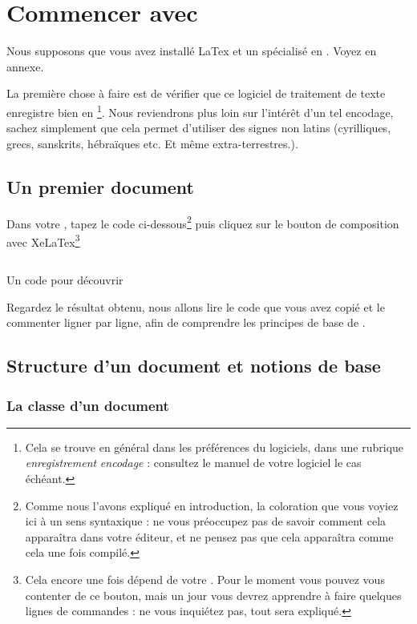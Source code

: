 \chapter{Commencer avec }

\begin{prealable}
Nous supposons que vous avez installé LaTex et un  spécialisé en . Voyez en annexe.

La première chose à faire est de vérifier que ce logiciel de traitement de texte enregistre bien en \footnote{Cela se trouve en général dans les préférences du logiciels, dans une rubrique \emph{enregistrement} \emph{encodage} : consultez le manuel de votre logiciel le cas échéant.}. Nous reviendrons plus loin sur l'intérêt d'un tel encodage, sachez simplement que cela permet d'utiliser des signes non latins (cyrilliques, grecs, sanskrits, hébraïques etc. Et même extra-terrestres.).

\end{prealable}

\section{Un premier document}

Dans votre , tapez le code ci-dessous\footnote{Comme nous l'avons expliqué en introduction, la coloration que vous voyiez ici à un sens syntaxique : ne vous préoccupez pas de savoir comment cela apparaîtra dans votre éditeur, et ne pensez pas que cela apparaîtra comme cela une fois compilé.} puis cliquez sur le bouton de composition avec XeLaTex\footnote{Cela encore une fois dépend de votre . Pour le moment vous pouvez vous contenter de ce bouton, mais un jour vous devrez apprendre à faire quelques lignes de commandes : ne vous inquiétez pas, tout sera expliqué.}

\begin{listing}[h]
\inputminted[linenos]{latex}{exemples/premierpas/structure/1.tex}


\caption{Un code pour découvrir }
\end{listing}

Regardez le résultat obtenu, nous allons lire le code que vous avez copié et le commenter ligner par ligne, afin de comprendre les principes de base de .
\FloatBarrier
\section{Structure d'un document  et notions de base}


\subsection{La classe d'un document}
